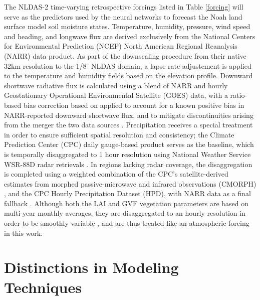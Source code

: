 The NLDAS-2 time-varying retrospective forcings listed in Table \ref{forcing} will serve as the predictors used by the neural networks to forecast the Noah land surface model soil moisture states. Temperature, humidity, pressure, wind speed and heading, and longwave flux are derived exclusively from the National Centers for Environmental Prediction (NCEP) North American Regional Reanalysis (NARR) data product. As part of the downscaling procedure from their native 32km resolution to the 1/8$^\circ$ NLDAS domain, a lapse rate adjustement is applied to the temperature and humidity fields based on the elevation profile. Downward shortwave radiative flux is calculated using a blend of NARR and hourly Geostationary Operational Environmental Satellite (GOES) data, with a ratio-based bias correction based on \citep{berg_impact_2003} applied to account for a known positive bias in NARR-reported downward shortwave flux, and to mitigate discontinuities arising from the merger the two data sources \citep{pinker_surface_2003} \citep{xia_continental-scale_2012-1}. Precipitation receives a special treatment in order to ensure sufficient spatial resolution and consistency; the Climate Prediction Center (CPC) daily gauge-based product \citep{chen_assessing_2008} serves as the baseline, which is temporally disaggregated to 1 hour resolution using National Weather Service WSR-88D radar retrievals \citep{fulton_wsr-88d_1998}. In regions lacking radar coverage, the disaggregation is completed using a weighted combination of the CPC's satellite-derived estimates from morphed passive-microwave and infrared observations (CMORPH) \citep{joyce_cmorph_2004}, and the CPC Hourly Precipitation Dataset (HPD), with NARR data as a final fallback \citep{baldwin_ncep_1997}.  Although both the LAI and GVF vegetation parameters are based on multi-year monthly averages, they are disaggregated to an hourly resolution in order to be smoothly variable \citep{wei_improvement_2011}, and are thus treated like an atmospheric forcing in this work.

\section{Distinctions in Modeling Techniques}

